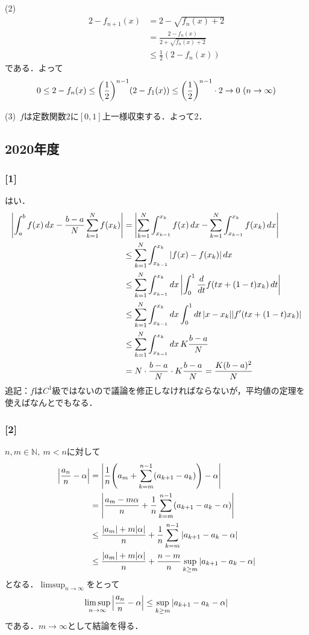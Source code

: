 \documentclass[a4j]{ltjsarticle}
\newcommand{\Nset}{\mathbb{N}}
\newcommand{\1}{\mathbbm{1}}
\numberwithin{equation}{section}
\theoremstyle{definition}
\begin{document}
(2) 
\begin{align}
    2-f_{n+1}(x)&=2-\sqrt{f_n(x)+2}\\
    &=\frac{2-f_n(x)}{2+\sqrt{f_n(x)+2}}\\
    &\leq \frac{1}{2}(2-f_n(x)) 
\end{align}
である．よって
\begin{equation}
    0\leq 2-f_n(x)\leq \qty(\frac{1}{2})^{n-1}(2-f_1(x))\leq \qty(\frac{1}{2})^{n-1}\cdot 2\to0 \ (n\to\infty)
\end{equation}

(3)\ $f$は定数関数$2$に$[0,1]$上一様収束する．よって2．
\subsection{2020年度}
\subsubsection*{[1]}
はい．
\begin{align}
    \abs{\int_{a}^{b}f(x)\,dx-\frac{b-a}{N}\sum_{k=1}^N f(x_k)}
    &=\abs{\sum_{k=1}^N \int_{x_{k-1}}^{x_k}f(x)\,dx-\sum_{k=1}^N \int_{x_{k-1}}^{x_k} f(x_k)\,dx}\\
    &\leq \sum_{k=1}^N \int_{x_{k-1}}^{x_k}\abs{f(x)-f(x_k)}\,dx\\
    &\leq \sum_{k=1}^N \int_{x_{k-1}}^{x_k}dx\,\abs{\int_{0}^{1}\frac{d}{dt}f(tx+(1-t)x_k)\,dt}\\
    &\leq \sum_{k=1}^N \int_{x_{k-1}}^{x_k}dx\int_{0}^{1}dt\,\abs{x-x_k}\abs{f'(tx+(1-t)x_k)}\\
    &\leq \sum_{k=1}^N \int_{x_{k-1}}^{x_k}dx\,K\frac{b-a}{N}\\
    &=N\cdot\frac{b-a}{N}\cdot K\frac{b-a}{N}=\frac{K(b-a)^2}{N}
\end{align}
追記：$f$は$C^1$級ではないので議論を修正しなければならないが，平均値の定理を使えばなんとでもなる．
\subsubsection*{[2]}
$n,m\in\Nset,\ m<n$に対して
\begin{align}
    \abs{\frac{a_n}{n}-\alpha}
    &= \abs{\frac{1}{n}\qty(a_m+\sum_{k=m}^{n-1}(a_{k+1}-a_k))-\alpha}\\
    &=\abs{\frac{a_m-m\alpha}{n}+\frac{1}{n}\sum_{k=m}^{n-1}(a_{k+1}-a_k-\alpha)}\\
    &\leq \frac{\abs{a_m}+m\abs{\alpha}}{n}+\frac{1}{n}\sum_{k=m}^{n-1}\abs{a_{k+1}-a_k-\alpha}\\
    &\leq \frac{\abs{a_m}+m\abs{\alpha}}{n}+\frac{n-m}{n}\sup_{k\geq m}\abs{a_{k+1}-a_k-\alpha}
\end{align}
となる．$\limsup_{n\to\infty}$をとって
\begin{equation}
    \limsup_{n\to\infty}\abs{\frac{a_n}{n}-\alpha}\leq \sup_{k\geq m}\abs{a_{k+1}-a_k-\alpha}
\end{equation}
である．$m\to\infty$として結論を得る．
\end{document}
